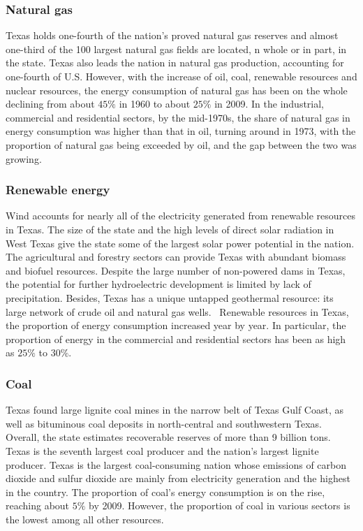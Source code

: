 \documentclass{mcmthesis}
\begin{document}
\subsubsection{Natural gas}
  Texas holds one-fourth of the nation's proved natural gas reserves and almost one-third of the 100 largest natural gas fields are located,
  n whole or in part, in the state. Texas also leads the nation in natural gas production, accounting for one-fourth of U.S. However,
  with the increase of oil, coal, renewable resources and nuclear resources, the energy consumption of natural gas has been on the
  whole declining from about $45\%$ in 1960 to about $25\%$ in 2009. In the industrial, commercial and residential sectors,
  by the mid-1970s, the share of natural gas in energy consumption was higher than that in oil, turning around in 1973,
  with the proportion of natural gas being exceeded by oil, and the gap between the two was growing.
\subsubsection{Renewable energy}
  Wind accounts for nearly all of the electricity generated from renewable resources in Texas. The size of the state and
  the high levels of direct solar radiation in West Texas give the state some of the largest solar power potential in the nation.
  The agricultural and forestry sectors can provide Texas with abundant biomass and biofuel resources.
  Despite the large number of non-powered dams in Texas, the potential for further hydroelectric development is limited by lack of precipitation.
  Besides, Texas has a unique untapped geothermal resource: its large network of crude oil and natural gas wells. 
  Renewable resources in Texas, the proportion of energy consumption increased year by year.
  In particular, the proportion of energy in the commercial and residential sectors has been as high as $25\%$ to $30\%$.
\subsubsection{Coal}
  Texas found large lignite coal mines in the narrow belt of Texas Gulf Coast, as well as bituminous coal deposits in north-central
  and southwestern Texas. Overall, the state estimates recoverable reserves of more than 9 billion tons.
  Texas is the seventh largest coal producer and the nation's largest lignite producer. Texas is the largest coal-consuming nation
  whose emissions of carbon dioxide and sulfur dioxide are mainly from electricity generation and the highest in the country.
  The proportion of coal's energy consumption is on the rise, reaching about $5\%$ by 2009. However, the proportion of coal in
  various sectors is the lowest among all other resources.
\end{document}
